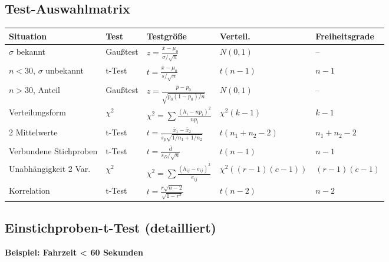 \documentclass[12pt, a4paper, ngerman]{scrartcl}
\begin{document}
\subsection{Test-Auswahlmatrix}

\begin{table}[h]
  \centering\small
  \begin{tabular}{|l|l|l|l|l|}
    \hline
    \textbf{Situation} & \textbf{Test} & \textbf{Testgröße} & \textbf{Verteil.} & \textbf{Freiheitsgrade} \\
    \hline
    $\sigma$ bekannt & Gaußtest & $z = \frac{\overline{x}-\mu_0}{\sigma/\sqrt{n}}$ & $N(0,1)$ & -- \\
    \hline
    $n < 30$, $\sigma$ unbekannt & t-Test & $t = \frac{\overline{x}-\mu_0}{s/\sqrt{n}}$ & $t(n-1)$ & $n-1$ \\
    \hline
    $n > 30$, Anteil & Gaußtest & $z = \frac{\hat{p}-p_0}{\sqrt{p_0(1-p_0)/n}}$ & $N(0,1)$ & -- \\
    \hline
    Verteilungsform & $\chi^2$ & $\chi^2 = \sum \frac{(h_i-np_i)^2}{np_i}$ & $\chi^2(k-1)$ & $k-1$ \\
    \hline
    2 Mittelwerte & t-Test & $t = \frac{\overline{x}_1-\overline{x}_2}{s_p\sqrt{1/n_1+1/n_2}}$ & $t(n_1+n_2-2)$ & $n_1+n_2-2$ \\
    \hline
    Verbundene Stichproben & t-Test & $t = \frac{\overline{d}}{s_D/\sqrt{n}}$ & $t(n-1)$ & $n-1$ \\
    \hline
    Unabhängigkeit 2 Var. & $\chi^2$ & $\chi^2 = \sum \frac{(h_{ij}-e_{ij})^2}{e_{ij}}$ & $\chi^2((r-1)(c-1))$ & $(r-1)(c-1)$ \\
    \hline
    Korrelation & t-Test & $t = \frac{r\sqrt{n-2}}{\sqrt{1-r^2}}$ & $t(n-2)$ & $n-2$ \\
    \hline
  \end{tabular}
\end{table}

\subsection{Einstichproben-t-Test (detailliert)}

\textbf{Beispiel: Fahrzeit < 60 Sekunden}
\end{document}
